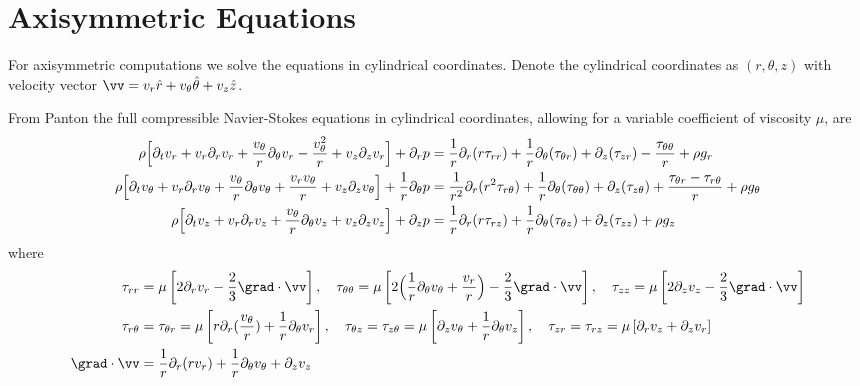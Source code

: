 \clearpage
\section{Axisymmetric Equations}

\newcommand{\vr}{v_r}
\newcommand{\vtheta}{v_\theta}
\newcommand{\vz}{v_z}
\newcommand{\twoThirds}{\frac{2}{3}}

For axisymmetric computations we solve the equations in cylindrical coordinates. 
Denote the cylindrical coordinates as $(r,\theta,z)$ with velocity vector $\vv = v_r \hat{r} + v_\theta \hat{\theta} + v_z \hat{z}$.


From Panton\cite{Panton} the full compressible Navier-Stokes equations in cylindrical coordinates, 
allowing for a variable coefficient of viscosity $\mu$, are 
\begin{align*}
\rho\Big[ \partial_t \vr + \vr\partial_r \vr + {\vtheta\over r}\partial_\theta \vr - {\vtheta^2\over r} + \vz\partial_z \vr\Big]
    + \partial_r p
   &= {1\over r}\partial_r( r\tau_{rr} ) + {1\over r}\partial_\theta(\tau_{\theta r}) + \partial_z(\tau_{zr} )
               - {\tau_{\theta\theta}\over r} + \rho g_r \\
\rho\Big[ \partial_t \vtheta + \vr\partial_r \vtheta + {\vtheta\over r}\partial_\theta \vtheta + {\vr \vtheta\over r} 
           + \vz\partial_z \vtheta\Big]
    + {1 \over r} \partial_\theta p
   &= {1\over r^2}\partial_r( r^2 \tau_{r\theta} ) + {1\over r}\partial_\theta(\tau_{\theta\theta}) + \partial_z(\tau_{z\theta} )
               + { \tau_{\theta r} - \tau_{r\theta} \over r} + \rho g_\theta \\
\rho\Big[ \partial_t \vz + \vr\partial_r \vz + {\vtheta\over r}\partial_\theta \vz + \vz\partial_z \vz\Big]
    + \partial_z p
   &= {1\over r}\partial_r( r\tau_{rz} ) + {1\over r}\partial_\theta(\tau_{\theta z}) + \partial_z(\tau_{zz} )
                                              + \rho g_z 
\end{align*}
where
\begin{align*}
 \tau_{rr} &= \mu \left[ 2\partial_r \vr - \twoThirds \grad\cdot\vv \right] , \quad
\tau_{\theta\theta} = \mu \left[ 2\Big( {1\over r}\partial_\theta \vtheta + {\vr\over r}\Big) - \twoThirds \grad\cdot\vv \right], \quad 
\tau_{zz} = \mu \left[ 2\partial_z \vz - \twoThirds \grad\cdot\vv \right] \\
\tau_{r\theta} &= \tau_{\theta r} = \mu \left[  r\partial_r({\vtheta\over r}) + {1\over r}\partial_\theta \vr \right], \quad
\tau_{\theta z} = \tau_{z\theta} = \mu \left[ \partial_z \vtheta +{1\over r}\partial_\theta \vz \right] , \quad
\tau_{zr} = \tau_{rz} = \mu \left[ \partial_r \vz + \partial_z \vr \right] \\
\grad\cdot\vv &= {1\over r}\partial_r( r\vr) + {1\over r}\partial_\theta \vtheta + \partial_z \vz 
\end{align*}

